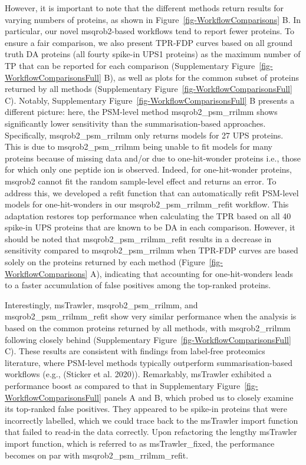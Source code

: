 \documentclass[
  letterpaper,
  DIV=11,
  numbers=noendperiod]{scrartcl}
\begin{document}
However, it is important to note that the different methods return
results for varying numbers of proteins, as shown in
Figure~\ref{fig-WorkflowComparisons} B. In particular, our novel
msqrob2-based workflows tend to report fewer proteins. To ensure a fair
comparison, we also present TPR-FDP curves based on all ground truth DA
proteins (all fourty spike-in UPS1 proteins) as the maximum number of TP
that can be reported for each comparison (Supplementary
Figure~\ref{fig-WorkflowComparisonsFull} B), as well as plots for the
common subset of proteins returned by all methods (Supplementary
Figure~\ref{fig-WorkflowComparisonsFull} C). Notably, Supplementary
Figure~\ref{fig-WorkflowComparisonsFull} B presents a different picture:
here, the PSM-level method msqrob2\_psm\_rrilmm shows significantly
lower sensitivity than the summarisation-based approaches. Specifically,
msqrob2\_psm\_rrilmm only returns models for 27 UPS proteins. This is
due to msqrob2\_psm\_rrilmm being unable to fit models for many proteins
because of missing data and/or due to one-hit-wonder proteins i.e.,
those for which only one peptide ion is observed. Indeed, for
one-hit-wonder proteins, msqrob2 cannot fit the random sample-level
effect and returns an error. To address this, we developed a refit
function that can automatically refit PSM-level models for
one-hit-wonders in our msqrob2\_psm\_rrilmm\_refit workflow. This
adaptation restores top performance when calculating the TPR based on
all 40 spike-in UPS proteins that are known to be DA in each comparison.
However, it should be noted that msqrob2\_psm\_rrilmm\_refit results in
a decrease in sensitivity compared to msqrob2\_psm\_rrilmm when TPR-FDP
curves are based solely on the proteins returned by each method
(Figure~\ref{fig-WorkflowComparisons} A), indicating that accounting for
one-hit-wonders leads to a faster accumulation of false positives among
the top-ranked proteins.

Interestingly, msTrawler, msqrob2\_psm\_rrilmm, and
msqrob2\_psm\_rrilmm\_refit show very similar performance when the
analysis is based on the common proteins returned by all methods, with
msqrob2\_rrilmm following closely behind (Supplementary
Figure~\ref{fig-WorkflowComparisonsFull} C). These results are
consistent with findings from label-free proteomics literature, where
PSM-level methods typically outperform summarisation-based workflows
(e.g., (Sticker et al. 2020)). Remarkably, msTrawler exhibited a
performance boost as compared to that in Supplementary
Figure~\ref{fig-WorkflowComparisonsFull} panels A and B, which probed us
to closely examine its top-ranked false positives. They appeared to be
spike-in proteins that were incorrectly labelled, which we could trace
back to the msTrawler import function that failed to read-in the data
correctly. Upon refactoring the lengthy msTrawler import function, which
is referred to as msTrawler\_fixed, the performance becomes on par with
msqrob2\_psm\_rrilmm\_refit.
\end{document}
